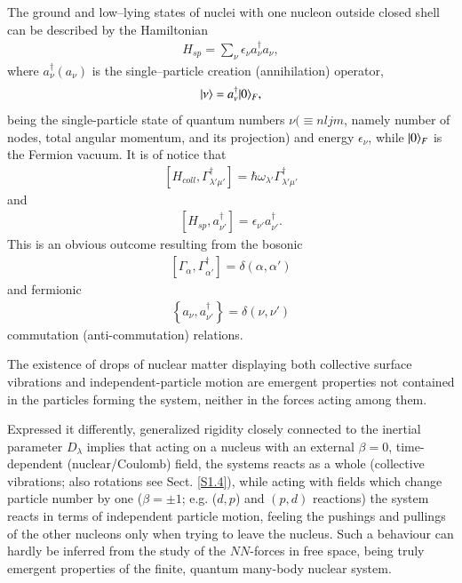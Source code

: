 The ground and low--lying states of nuclei with one nucleon outside closed shell can be described by the Hamiltonian
\begin{align}\label{eq1.0.10}
H_{sp}=\sum_{\nu}\epsilon_\nu a_\nu^\dagger a_\nu,
\end{align}
where $a_\nu^\dagger (a_\nu)$ is the single--particle creation (annihilation) operator,
\begin{align}\label{eq1.0.11}
|{\nu} \rangle=a_\nu^\dagger|{0} \rangle_F,
\end{align}
being the single-particle state of quantum numbers $\nu(\equiv nljm$, namely number of nodes, total angular momentum, and its projection) and energy $\epsilon_\nu$, while $|{0} \rangle_F$ is the Fermion vacuum. 
It is of notice that
\begin{align}\label{eq0.1.14}
\left[H_{coll},\Gamma^\dagger_{\lambda'\mu'}\right]=\hbar\omega_{\lambda'}\Gamma^\dagger_{\lambda'\mu'}
\end{align}
and 
\begin{align}\label{eq0.1.15}
\left[H_{sp},a^\dagger_{\nu'}\right]=\epsilon_{\nu'}a^\dagger_{\nu'}.
\end{align}
	This is an obvious outcome resulting from the bosonic
\begin{align}\label{eq0.1.16}
\left[\Gamma_{\alpha},\Gamma^\dagger_{\alpha'}\right]=\delta(\alpha,\alpha')
\end{align}
	and fermionic
\begin{align}
\left\{a_\nu,a^\dagger_{\nu'}\right\}=\delta(\nu,\nu')
\end{align}
commutation (anti-commutation) relations.


 The existence of drops of nuclear matter displaying both collective surface vibrations and independent-particle motion  are emergent properties not contained in the particles forming the system, neither in the forces acting among them. 


Expressed it differently, generalized rigidity closely connected to the inertial parameter $D_\lambda$ implies that acting on a nucleus with an external $\beta=0$, time-dependent (nuclear/Coulomb) field, the systems reacts as a whole (collective vibrations; also rotations see Sect. \ref{S1.4}), while acting with fields which change particle number by one ($\beta=\pm1$; e.g. ($d,p$) and $(p,d)$ reactions) the system reacts in terms of independent particle motion, feeling the pushings and pullings of the other nucleons only when trying to leave the nucleus. Such a behaviour can hardly be inferred from the study of the $NN$-forces in free space, being truly emergent properties of the finite, quantum many-body nuclear system.


